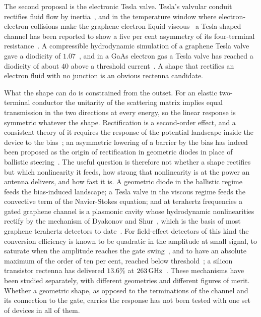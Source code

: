The second proposal is the electronic Tesla valve. Tesla's valvular
conduit~\cite{tesla1920valvular} rectifies fluid flow by
inertia~\cite{nguyen2021early}, and in the temperature window where
electron-electron collisions make the graphene electron liquid
viscous~\cite{bandurin2016negative,krishnakumar2017superballistic} a
Tesla-shaped channel has been reported to show a five per cent asymmetry of
its four-terminal resistance~\cite{geurs2020rectification}. A compressible
hydrodynamic simulation of a graphene Tesla valve gave a diodicity of
$1.07$~\cite{gungor2022modeling}, and in a GaAs electron gas a Tesla valve
has reached a diodicity of about $40$ above a threshold
current~\cite{sarypov2026electron}. A shape that rectifies an electron fluid
with no junction is an obvious rectenna candidate.

What the shape can do is constrained from the outset. For an elastic
two-terminal conductor the unitarity of the scattering matrix implies equal
transmission in the two directions at every energy, so the linear response
is symmetric whatever the shape. Rectification is a second-order effect,
and a consistent theory of it requires the response of the potential
landscape inside the device to the
bias~\cite{christen1996gauge,sanchez2004magnetic,song1999formalism,lofgren2004symmetry};
an asymmetric lowering of a barrier by the bias has indeed been proposed as
the origin of rectification in geometric diodes in place of ballistic
steering~\cite{bai2021asymmetric}. The useful question is therefore not
whether a shape rectifies but which nonlinearity it feeds, how strong that
nonlinearity is at the power an antenna delivers, and how fast it is. A
geometric diode in the ballistic regime feeds the bias-induced landscape; a
Tesla valve in the viscous regime feeds the convective term of the
Navier-Stokes equation; and at terahertz frequencies a gated graphene
channel is a plasmonic cavity whose hydrodynamic nonlinearities
rectify by the mechanism of Dyakonov and
Shur~\cite{dyakonov1993shallow,dyakonov1996detection}, which is the basis of
most graphene terahertz detectors to
date~\cite{vicarelli2012graphene,bandurin2018resonant}. For field-effect
detectors of this kind the conversion efficiency is known to be quadratic
in the amplitude at small signal, to saturate when the amplitude reaches
the gate swing~\cite{gutin2012plasmonic,rudin2014theory,but2014nonlinear},
and to have an absolute maximum of the order of ten per cent, reached below
threshold~\cite{kachorovskii2013performance}; a silicon transistor rectenna
has delivered $13.6\%$ at $263\,\mathrm{GHz}$~\cite{khan2022cmos}. These mechanisms
have been studied separately, with different geometries and different
figures of merit. Whether a geometric shape, as opposed to the terminations
of the channel and its connection to the gate, carries the response has not
been tested with one set of devices in all of them.

